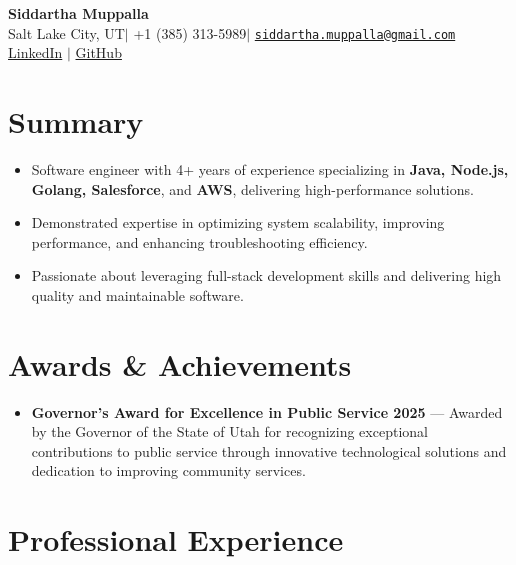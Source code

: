 \documentclass[letterpaper,10pt]{article}
\makeatletter
\newcommand{\Name}{Siddartha Muppalla}
\newcommand{\Location}{Salt Lake City, UT}
\newcommand{\Phone}{+1 (385) 313-5989}
\newcommand{\EmailAddr}{siddartha.muppalla@gmail.com}
\newcommand{\LinkedIn}{https://linkedin.com/in/siddartha-muppalla}
\newcommand{\GitHub}{https://github.com/siddarthamuppalla}
\makeatother
\begin{document}
\begin{center}
  {\LARGE\bfseries \Name}\\[4pt]
  \small\Location \quad $|$ \quad \Phone \quad $|$ \quad \href{mailto:\EmailAddr}{\texttt{\EmailAddr}}\\
  \small\href{\LinkedIn}{LinkedIn} \quad $|$ \quad \href{\GitHub}{GitHub}
\end{center}

\section*{Summary}
\begin{itemize}
  \item Software engineer with 4+ years of experience specializing in \textbf{Java, Node.js, Golang, Salesforce}, and \textbf{AWS}, delivering high-performance solutions.
  \item Demonstrated expertise in optimizing system scalability, improving performance, and enhancing troubleshooting efficiency.
  \item Passionate about leveraging full-stack development skills and delivering high quality and maintainable software.
\end{itemize}

\section*{Awards \& Achievements}
\begin{itemize}
  \item \textbf{Governor's Award for Excellence in Public Service 2025} --- Awarded by the Governor of the State of Utah for recognizing exceptional contributions to public service through innovative technological solutions and dedication to improving community services.
\end{itemize}

\section*{Professional Experience}
\end{document}
